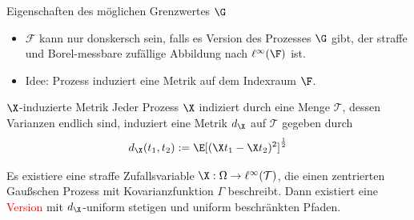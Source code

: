 \begin{frame}{Eigenschaften des möglichen Grenzwertes $\G$}
    \begin{itemize}
        \item $\mathcal{F}$ kann nur donskersch sein, falls es Version des Prozesses $\G$ gibt, der straffe und Borel-messbare zufällige Abbildung nach $\ell^\infty(\F)$ ist.
        \pause
        \item Idee: Prozess induziert eine Metrik auf dem Indexraum $\F$. 
    \end{itemize}
    \begin{definitionblockname}{$\X$-induzierte Metrik}
        Jeder Prozess $\X$ indiziert durch eine Menge $\mathcal{T}$, dessen Varianzen endlich sind, induziert eine Metrik $d_\X$ auf $\mathcal{T}$ gegeben durch \[
d_\X(t_1,t_2) := \E[(\X t_1 - \X t_2)^2]^{\frac{1}{2}}
        \]
    \end{definitionblockname}
    \pause
    \begin{theoremblock}
        Es existiere eine straffe Zufallsvariable $\X: \Omega \to \ell^\infty(\mathcal{T})$, die einen zentrierten Gaußschen Prozess mit Kovarianzfunktion $\Gamma$ beschreibt. Dann existiert eine \textcolor{red}{Version} mit $d_\X$-uniform stetigen und uniform beschränkten Pfaden.
    \end{theoremblock}
\end{frame}

